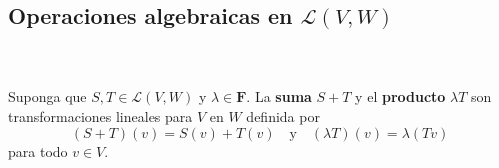 \vspace{.5cm}

\subsection*{Operaciones algebraicas en \boldmath $\mathcal{L}(V,W)$}

\setcounter{mydef}{5}
\begin{mydef}\,\\\\
    Suponga que $S,T\in \mathcal{L}(V,W)$ y $\lambda \in \textbf{F}$. La \textbf{suma} $S+T$ y el \textbf{producto} $\lambda T$ son transformaciones lineales para $V$ en $W$ definida por
    $$(S+T)(v)=S(v)+T(v) \quad \mbox{y} \quad (\lambda T)(v)=\lambda(Tv)$$
    para todo $v\in V$.
\end{mydef}

